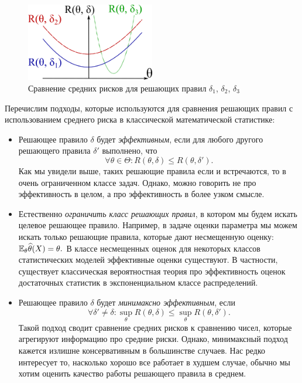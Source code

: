 \begin{figure}[h!]
\centering
\includegraphics[width=0.5\textwidth]{figures/risk_comparison.png}
\caption{Сравнение средних рисков для решающих правил 
$\delta_1$, $\delta_2$, $\delta_3$}
\label{fig:risk_comparison}
\end{figure}

Перечислим подходы, которые используются для сравнения решающих правил с использованием среднего риска в классической математической статистике:
\begin{itemize}
	\item Решающее правило $\delta$ будет \emph{эффективным}, если для любого другого решающего правила $\delta'$ выполнено, что 
	\[
	\forall \theta \in \Theta: R(\theta, \delta) \leq R(\theta, \delta').
	\]
	Как мы увидели выше, таких решающие правила если и встречаются, то в очень ограниченном классе задач. Однако, можно говорить не про эффективность в целом, а про эффективность в более узком смысле.
	\item Естественно \emph{ограничить класс решающих правил}, в котором мы будем искать целевое решающее правило. Например, в задаче оценки параметра мы можем искать только решающие правила, которые дают несмещенную оценку: $\mathbb{E}_{\theta} \widehat{\theta}(X) = \theta.$ В классе несмещенных оценок для некоторых классов статистических моделей эффективные оценки существуют. В частности, существует классическая вероятностная теория про эффективность оценок достаточных статистик в экспоненциальном классе распределений.
	\item Решающее правило $\delta$ будет \emph{минимаксно эффективным},
	если 
	\[
	\forall \delta' \ne \delta: \sup_{\theta} R(\theta, \delta) \leq 
	\sup_{\theta} R(\theta, \delta').
	\]
	Такой подход сводит сравнение средних рисков к сравнению чисел,
	которые агрегируют информацию про средние риски.
	Однако, минимаксный подход кажется излишне консервативным в большинстве случаев. Нас редко интересует то, насколько хорошо все работает в худшем случае, обычно мы хотим оценить качество работы решающего правила в среднем.
\end{itemize}

